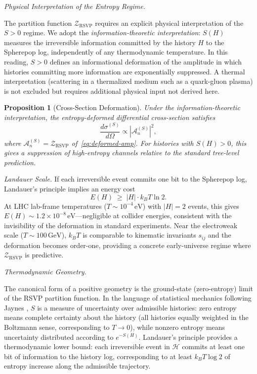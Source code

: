 \documentclass[11pt]{article}
\theoremstyle{plain}
\newtheorem{proposition}[theorem]{Proposition}
\theoremstyle{definition}
\theoremstyle{remark}
\newcommand{\Sf}{S}
\newcommand{\OmKS}{\Omega}
\newcommand{\HKS}{\mathcal{H}}
\newcommand{\ZRSVP}{\mathcal{Z}_{\mathrm{RSVP}}}
\begin{document}
\medskip\noindent\textit{Physical Interpretation of the Entropy Regime.}

The partition function $\ZRSVP$ requires an explicit physical interpretation of the $\Sf > 0$ regime. We adopt the \emph{information-theoretic interpretation}: $\Sf(H)$ measures the irreversible information committed by the history $H$ to the Spherepop log, independently of any thermodynamic temperature. In this reading, $\Sf > 0$ defines an informational deformation of the amplitude in which histories committing more information are exponentially suppressed. A thermal interpretation (scattering in a thermalized medium such as a quark-gluon plasma) is not excluded but requires additional physical input not derived here.

\begin{proposition}[Cross-Section Deformation]
Under the information-theoretic interpretation, the entropy-deformed differential cross-section satisfies
\[
  \frac{d\sigma^{(\Sf)}}{d\OmKS} \propto |\mathcal{A}_n^{(\Sf)}|^2,
\]
where $\mathcal{A}_n^{(\Sf)} = \ZRSVP$ of~\eqref{eq:deformed-amp}. For histories with $\Sf(H) > 0$, this gives a suppression of high-entropy channels relative to the standard tree-level prediction.
\end{proposition}

\medskip\noindent\textit{Landauer Scale.}\quad
If each irreversible event commits one bit to the Spherepop log, Landauer's principle \cite{Landauer1961} implies an energy cost
\[
  E(H) \;\geq\; |H| \cdot k_B T \ln 2.
\]
At LHC lab-frame temperatures ($T \sim 10^{-4}\,\mathrm{eV}$) with $|H|=2$ events, this gives $E(H) \sim 1.2 \times 10^{-8}\,\mathrm{eV}$---negligible at collider energies, consistent with the invisibility of the deformation in standard experiments. Near the electroweak scale ($T \sim 100\,\mathrm{GeV}$), $k_BT$ is comparable to kinematic invariants $s_{ij}$ and the deformation becomes order-one, providing a concrete early-universe regime where $\ZRSVP$ is predictive.

\medskip\noindent\textit{Thermodynamic Geometry.}

The canonical form of a positive geometry is the ground-state (zero-entropy) limit of the RSVP partition function. In the language of statistical mechanics following Jaynes \cite{Jaynes1957}, $\Sf$ is a measure of uncertainty over admissible histories: zero entropy means complete certainty about the history (all histories equally weighted in the Boltzmann sense, corresponding to $T \to 0$), while nonzero entropy means uncertainty distributed according to $e^{-\Sf(H)}$. Landauer's principle \cite{Landauer1961} provides a thermodynamic lower bound: each irreversible event in $\HKS$ commits at least one bit of information to the history log, corresponding to at least $k_B T \log 2$ of entropy increase along the admissible trajectory.
\end{document}
